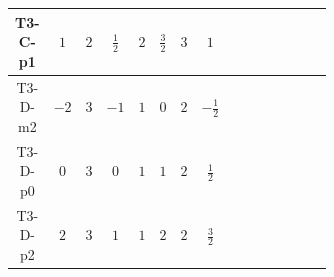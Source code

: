 \documentclass[8pt]{article}
\begin{document}
\begin{landscape}
\begin{longtable}{@{}cccccccc >{\raggedright\arraybackslash}p{0.21\linewidth} >{\raggedright\arraybackslash}p{0.21\linewidth} >{\raggedright\arraybackslash}p{0.21\linewidth}@{}}
\midrule
T3-C-p1 & $1$ & $2$ & $\frac{1}{2}$ & $2$ & $\frac{3}{2}$ & $3$ & $1$ & \scriptsize\adjustbox{max width=\linewidth}{$\begin{gathered} +D_{\mu _1}\left(S_{2,j_1}\right){}^{\dagger } D_{\mu _1}\left(S_{2,j_1}\right)\end{gathered}$} & \scriptsize\adjustbox{max width=\linewidth}{$\begin{gathered} -\frac{3 \hbar  B_{\mu _1\mu _2}^2}{\epsilon }\end{gathered}$} & \scriptsize\adjustbox{max width=\linewidth}{$\begin{gathered} -\frac{2 \hbar  \left(W_{\mu _1\mu _2}^{A_1}\right){}^2}{\epsilon }\end{gathered}$} \\
\midrule
T3-D-m2 & $-2$ & $3$ & $-1$ & $1$ & $0$ & $2$ & $-\frac{1}{2}$ & \scriptsize\adjustbox{max width=\linewidth}{$\begin{gathered} +D_{\mu _1}\left(S_2\right){}^{\dagger } D_{\mu _1}\left(S_2\right)\end{gathered}$} & \scriptsize\adjustbox{max width=\linewidth}{$\begin{gathered} -\frac{\hbar  B_{\mu _1\mu _2}^2}{2 \epsilon }\end{gathered}$} & \scriptsize\adjustbox{max width=\linewidth}{$\begin{gathered} -\frac{\hbar  \left(W_{\mu _1\mu _2}^{A_1}\right){}^2}{2 \epsilon }\end{gathered}$} \\
\midrule
T3-D-p0 & $0$ & $3$ & $0$ & $1$ & $1$ & $2$ & $\frac{1}{2}$ & \scriptsize\adjustbox{max width=\linewidth}{$\begin{gathered} +D_{\mu _1}\left(S_2\right){}^{\dagger } D_{\mu _1}\left(S_2\right)\end{gathered}$} & \scriptsize\adjustbox{max width=\linewidth}{$\begin{gathered} -\frac{\hbar  B_{\mu _1\mu _2}^2}{2 \epsilon }\end{gathered}$} & \scriptsize\adjustbox{max width=\linewidth}{$\begin{gathered} -\frac{\hbar  \left(W_{\mu _1\mu _2}^{A_1}\right){}^2}{2 \epsilon }\end{gathered}$} \\
\midrule
T3-D-p2 & $2$ & $3$ & $1$ & $1$ & $2$ & $2$ & $\frac{3}{2}$ & \scriptsize\adjustbox{max width=\linewidth}{$\begin{gathered} +D_{\mu _1}\left(S_2\right){}^{\dagger } D_{\mu _1}\left(S_2\right)\end{gathered}$} & \scriptsize\adjustbox{max width=\linewidth}{$\begin{gathered} -\frac{9 \hbar  B_{\mu _1\mu _2}^2}{2 \epsilon }\end{gathered}$} & \scriptsize\adjustbox{max width=\linewidth}{$\begin{gathered} -\frac{\hbar  \left(W_{\mu _1\mu _2}^{A_1}\right){}^2}{2 \epsilon }\end{gathered}$} \\

\end{longtable}
\end{landscape}
\end{document}
